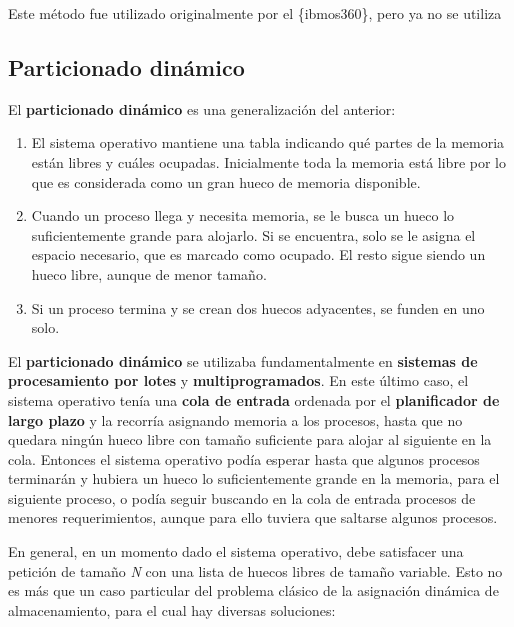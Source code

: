 Este método fue utilizado originalmente por el \{ibmos360\}, pero ya no
se utiliza

\subsection{Particionado dinámico}\label{_particionado_dinuxe1mico}

{} El \textbf{particionado dinámico} es una generalización del anterior:

\begin{enumerate}
\def\labelenumi{\arabic{enumi}.}
\item
  El sistema operativo mantiene una tabla indicando qué partes de la
  memoria están libres y cuáles ocupadas. Inicialmente toda la memoria
  está libre por lo que es considerada como un gran hueco de memoria
  disponible.
\item
  Cuando un proceso llega y necesita memoria, se le busca un hueco lo
  suficientemente grande para alojarlo. Si se encuentra, solo se le
  asigna el espacio necesario, que es marcado como ocupado. El resto
  sigue siendo un hueco libre, aunque de menor tamaño.
\item
  Si un proceso termina y se crean dos huecos adyacentes, se funden en
  uno solo.
\end{enumerate}

El \textbf{particionado dinámico} se utilizaba fundamentalmente en
\textbf{sistemas de procesamiento por lotes} y
\textbf{multiprogramados}. En este último caso, el sistema operativo
tenía una \textbf{cola de entrada} ordenada por el \textbf{planificador
de largo plazo} y la recorría asignando memoria a los procesos, hasta
que no quedara ningún hueco libre con tamaño suficiente para alojar al
siguiente en la cola. Entonces el sistema operativo podía esperar hasta
que algunos procesos terminarán y hubiera un hueco lo suficientemente
grande en la memoria, para el siguiente proceso, o podía seguir buscando
en la cola de entrada procesos de menores requerimientos, aunque para
ello tuviera que saltarse algunos procesos.

En general, en un momento dado el sistema operativo, debe satisfacer una
petición de tamaño \emph{N} con una lista de huecos libres de tamaño
variable. Esto no es más que un caso particular del problema clásico de
la asignación dinámica de almacenamiento, para el cual hay diversas
soluciones:

